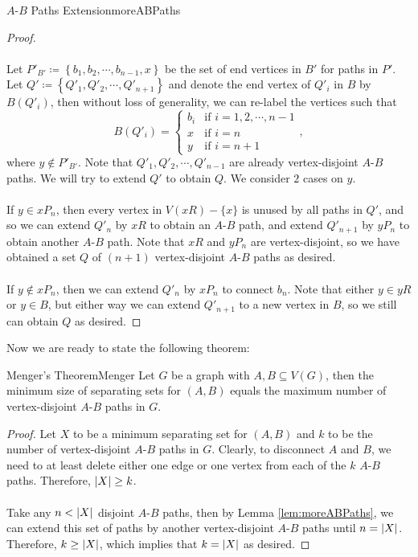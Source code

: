 \documentclass[math, code]{amznotes}
\theoremstyle{remark}
\begin{document}
\begin{lembox}{$A$-$B$ Paths Extension}{moreABPaths}
\begin{proof}
        \\\\
        Let $P'_{B'} \coloneqq \left\{b_1, b_2, \cdots, b_{n - 1}, x\right\}$ be the set of end vertices in $B'$ for paths in $P'$. Let $Q' \coloneqq \left\{Q'_1, Q'_2, \cdots, Q'_{n + 1}\right\}$ and denote the end vertex of $Q'_i$ in $B$ by $B(Q'_i)$, then without loss of generality, we can re-label the vertices such that 
        \begin{equation*}
            B(Q'_i) = \begin{cases}
                b_i & \textrm{if } i = 1, 2, \cdots, n - 1 \\
                x & \textrm{if } i = n \\
                y & \textrm{if } i = n + 1
            \end{cases},
        \end{equation*}
        where $y \notin P'_{B'}$. Note that $Q'_1, Q'_2, \cdots, Q'_{n - 1}$ are already vertex-disjoint $A$-$B$ paths. We will try to extend $Q'$ to obtain $Q$. We consider $2$ cases on $y$.
        \\\\
        If $y \in xP_n$, then every vertex in $V(xR) - \{x\}$ is unused by all paths in $Q'$, and so we can extend $Q'_n$ by $xR$ to obtain an $A$-$B$ path, and extend $Q'_{n + 1}$ by $yP_n$ to obtain another $A$-$B$ path. Note that $xR$ and $yP_n$ are vertex-disjoint, so we have obtained a set $Q$ of $(n + 1)$ vertex-disjoint $A$-$B$ paths as desired.
        \\\\
        If $y \notin xP_n$, then we can extend $Q'_n$ by $xP_n$ to connect $b_n$. Note that either $y \in yR$ or $y \in B$, but either way we can extend $Q'_{n + 1}$ to a new vertex in $B$, so we still can obtain $Q$ as desired.
    \end{proof}
\end{lembox}
Now we are ready to state the following theorem:
\begin{thmbox}{Menger's Theorem}{Menger}
    Let $G$ be a graph with $A, B \subseteq V(G)$, then the minimum size of separating sets for $(A, B)$ equals the maximum number of vertex-disjoint $A$-$B$ paths in $G$.
    \tcblower
    \begin{proof}
        Let $X$ to be a minimum separating set for $(A, B)$ and $k$ to be the number of vertex-disjoint $A$-$B$ paths in $G$. Clearly, to disconnect $A$ and $B$, we need to at least delete either one edge or one vertex from each of the $k$ $A$-$B$ paths. Therefore, ${\left\lvert {X} \right\rvert} \geq k$.
        \\\\
        Take any $n < {\left\lvert {X} \right\rvert}$ disjoint $A$-$B$ paths, then by Lemma \ref{lem:moreABPaths}, we can extend this set of paths by another vertex-disjoint $A$-$B$ paths until $n = {\left\lvert {X} \right\rvert}$. Therefore, $k \geq {\left\lvert {X} \right\rvert}$, which implies that $k = {\left\lvert {X} \right\rvert}$ as desired.
    \end{proof}
\end{thmbox}
\end{document}
